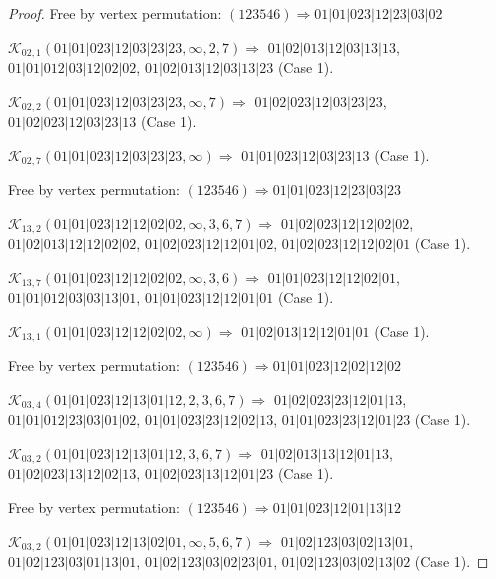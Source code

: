\documentclass[12pt]{article}
\theoremstyle{plain}
\theoremstyle{definition}
\theoremstyle{remark}
\newcommand{\fancy}[1]{\mathcal{#1}}
\def\K{\fancy{K}}
\begin{document}
\begin{proof}
	
	
	Free by vertex permutation: $(1 2 3 5 4 6)\Rightarrow 01|01|023|12|23|03|02$
	
	
	
	\bigskip
	
	$\K_{02,1}(01|01|023|12|03|23|23,\infty,2, 7)\Rightarrow $ $01|02|013|12|03|13|13$, $01|01|012|03|12|02|02$, $01|02|013|12|03|13|23$ (Case 1).
	
	$\K_{02,2}(01|01|023|12|03|23|23,\infty,7)\Rightarrow $ $01|02|023|12|03|23|23$, $01|02|023|12|03|23|13$ (Case 1).
	
	$\K_{02,7}(01|01|023|12|03|23|23,\infty)\Rightarrow $ $01|01|023|12|03|23|13$ (Case 1).
	
	
	
	Free by vertex permutation: $(1 2 3 5 4 6)\Rightarrow 01|01|023|12|23|03|23$
	
	
	
	\bigskip
	
	$\K_{13,2}(01|01|023|12|12|02|02,\infty,3, 6, 7)\Rightarrow $ $01|02|023|12|12|02|02$, $01|02|013|12|12|02|02$, $01|02|023|12|12|01|02$, $01|02|023|12|12|02|01$ (Case 1).
	
	$\K_{13,7}(01|01|023|12|12|02|02,\infty,3, 6)\Rightarrow $ $01|01|023|12|12|02|01$, $01|01|012|03|03|13|01$, $01|01|023|12|12|01|01$ (Case 1).
	
	$\K_{13,1}(01|01|023|12|12|02|02,\infty)\Rightarrow $ $01|02|013|12|12|01|01$ (Case 1).
	
	
	
	Free by vertex permutation: $(1 2 3 5 4 6)\Rightarrow 01|01|023|12|02|12|02$
	
	
	
	\bigskip
	
	$\K_{03,4}(01|01|023|12|13|01|12,2, 3, 6, 7)\Rightarrow $ $01|02|023|23|12|01|13$, $01|01|012|23|03|01|02$, $01|01|023|23|12|02|13$, $01|01|023|23|12|01|23$ (Case 1).
	
	$\K_{03,2}(01|01|023|12|13|01|12,3, 6, 7)\Rightarrow $ $01|02|013|13|12|01|13$, $01|02|023|13|12|02|13$, $01|02|023|13|12|01|23$ (Case 1).
	
	
	
	Free by vertex permutation: $(1 2 3 5 4 6)\Rightarrow 01|01|023|12|01|13|12$
	
	
	
	\bigskip
	
	$\K_{03,2}(01|01|023|12|13|02|01,\infty,5, 6, 7)\Rightarrow $ $01|02|123|03|02|13|01$, $01|02|123|03|01|13|01$, $01|02|123|03|02|23|01$, $01|02|123|03|02|13|02$ (Case 1).
	

\end{proof}
\end{document}
